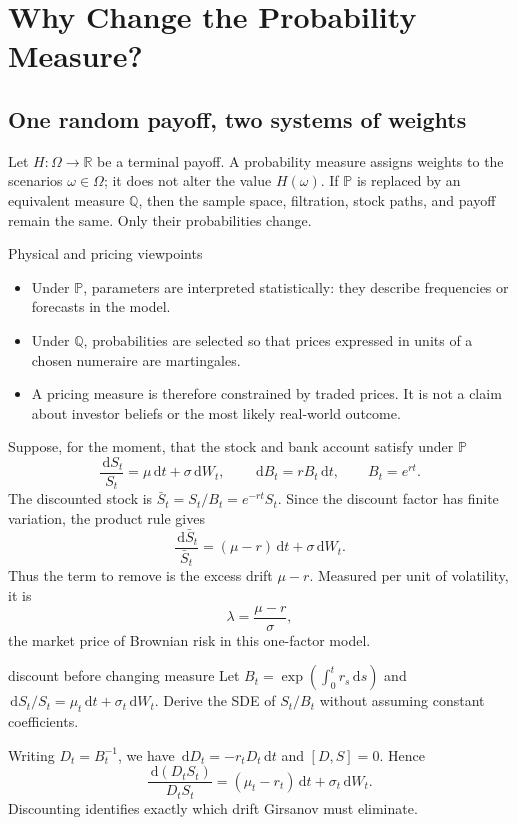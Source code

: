 \documentclass[10pt]{article}
\newcommand{\Pp}{\mathbb P}
\newcommand{\Q}{\mathbb Q}
\newcommand{\R}{\mathbb R}
\newcommand{\1}{\mathbf 1}
\newcommand{\dd}{\,\mathrm d}
\theoremstyle{definition}
\begin{document}
\section{Why Change the Probability Measure?}

\subsection{One random payoff, two systems of weights}

Let \(H:\Omega\to\R\) be a terminal payoff. A probability measure assigns
weights to the scenarios \(\omega\in\Omega\); it does not alter the value
\(H(\omega)\). If \(\Pp\) is replaced by an equivalent measure \(\Q\), then
the sample space, filtration, stock paths, and payoff remain the same.
Only their probabilities change.

\begin{keyidea}{Physical and pricing viewpoints}
\begin{itemize}
  \item Under \(\Pp\), parameters are interpreted statistically: they describe
        frequencies or forecasts in the model.
  \item Under \(\Q\), probabilities are selected so that prices expressed in
        units of a chosen numeraire are martingales.
  \item A pricing measure is therefore constrained by traded prices. It is not
        a claim about investor beliefs or the most likely real-world outcome.
\end{itemize}
\end{keyidea}

Suppose, for the moment, that the stock and bank account satisfy under
\(\Pp\)
\[
\frac{\dd S_t}{S_t}=\mu\dd t+\sigma\dd W_t,
\qquad
\dd B_t=rB_t\dd t,
\qquad B_t=e^{rt}.
\]
The discounted stock is \(\bar S_t=S_t/B_t=e^{-rt}S_t\). Since the discount
factor has finite variation, the product rule gives
\[
\boxed{
\frac{\dd\bar S_t}{\bar S_t}
=(\mu-r)\dd t+\sigma\dd W_t.}
\]
Thus the term to remove is the excess drift \(\mu-r\). Measured per unit of
volatility, it is
\[
\lambda=\frac{\mu-r}{\sigma},
\]
the market price of Brownian risk in this one-factor model.

\begin{studentexercise}{discount before changing measure}
Let \(B_t=\exp(\int_0^t r_s\dd s)\) and
\(\dd S_t/S_t=\mu_t\dd t+\sigma_t\dd W_t\). Derive the SDE of
\(S_t/B_t\) without assuming constant coefficients.
\end{studentexercise}
\begin{shortsolution}
Writing \(D_t=B_t^{-1}\), we have \(\dd D_t=-r_tD_t\dd t\) and
\([D,S]=0\). Hence
\[
\boxed{
\frac{\dd(D_tS_t)}{D_tS_t}
=(\mu_t-r_t)\dd t+\sigma_t\dd W_t.}
\]
Discounting identifies exactly which drift Girsanov must eliminate.
\end{shortsolution}
\end{document}
